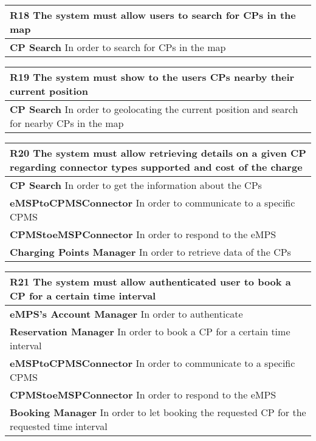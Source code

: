 \begin{table}[H]
    \begin{tabularx}{\textwidth}{X}
        \toprule
        \textbf{R18} The system must allow users to search for CPs in the map \\ \midrule
        \textbf{CP Search} In order to search for CPs in the map              \\
    \end{tabularx}
\end{table}
\begin{table}[H]
    \begin{tabularx}{\textwidth}{X}
        \toprule
        \textbf{R19} The system must show to the users CPs nearby their current position                     \\ \midrule
        \textbf{CP Search} In order to geolocating the current position and search for nearby CPs in the map \\
    \end{tabularx}
\end{table}
\begin{table}[H]
    \begin{tabularx}{\textwidth}{X}
        \toprule
        \textbf{R20}
        The system must allow retrieving details on a given CP regarding connector
        types supported and cost of the charge                                  \\ \midrule
        \textbf{CP Search} In order to get the information about the CPs        \\
        \textbf{eMSPtoCPMSConnector} In order to communicate to a specific CPMS \\
        \textbf{CPMStoeMSPConnector} In order to respond to the eMPS            \\
        \textbf{Charging Points Manager} In order to retrieve data of the CPs   \\
    \end{tabularx}
\end{table}
\begin{table}[H]
    \begin{tabularx}{\textwidth}{X}
        \toprule
        \textbf{R21} The system must allow authenticated user to book a CP for a certain time interval    \\ \midrule
        \textbf{eMPS's Account Manager} In order to authenticate                                          \\
        \textbf{Reservation Manager} In order to book a CP for a certain time interval                    \\
        \textbf{eMSPtoCPMSConnector} In order to communicate to a specific CPMS                           \\
        \textbf{CPMStoeMSPConnector} In order to respond to the eMPS                                      \\
        \textbf{Booking Manager} In order to let booking the requested CP for the requested time interval \\
    \end{tabularx}
\end{table}
